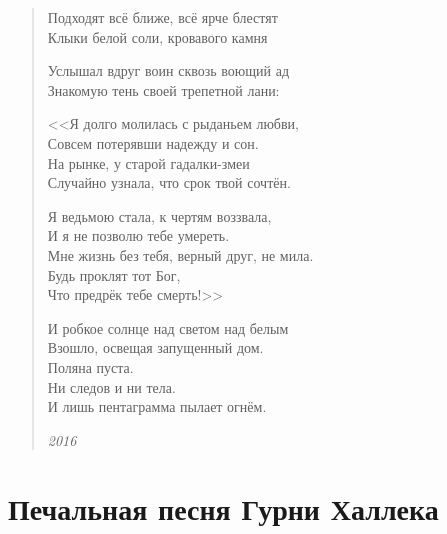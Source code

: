 \documentclass[a4paper,12pt]{article}
\newcommand{\ldotst}{\so{...}\xspace}
\begin{document}
\begin{verse}
Подходят всё ближе, всё ярче блестят\\
Клыки белой соли, кровавого камня\ldotst

Услышал вдруг воин сквозь воющий ад\\
Знакомую тень своей трепетной лани:

<<Я долго молилась с рыданьем любви,\\
Совсем потерявши надежду и сон.\\
На рынке, у старой гадалки-змеи\\
Случайно узнала, что срок твой сочтён.

Я ведьмою стала, к чертям воззвала,\\
И я не позволю тебе умереть.\\
Мне жизнь без тебя, верный друг, не мила.\\
Будь проклят тот Бог,\\
Что предрёк тебе смерть!>>

И робкое солнце над светом над белым\\
Взошло, освещая запущенный дом.\\
Поляна пуста.\\
Ни следов и ни тела.\\
И лишь пентаграмма пылает огнём.

\emph{2016}
\end{verse}
\newpage

\section{Печальная песня Гурни Халлека}
\end{document}
